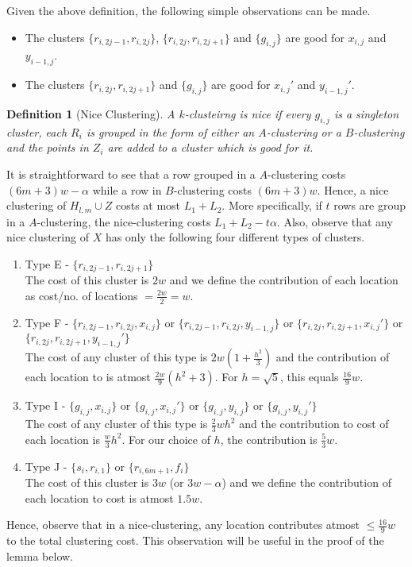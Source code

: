 \documentclass{article}
\newtheorem{definition}[theorem]{Definition}
\begin{document}
Given the above definition, the following simple observations can be made. 
\begin{itemize}[nolistsep,noitemsep]
\item The clusters $\{r_{i,2j-1}, r_{i, 2j}\}$, $\{r_{i,2j}, r_{i, 2j+1}\}$ and $\{g_{i,j}\}$ are good for $x_{i,j}$ and $y_{i-1,j}$.
\item The clusters $\{r_{i,2j}, r_{i, 2j+1}\}$ and $\{g_{i,j}\}$ are good for $x_{i,j}'$ and $y_{i-1,j}'$.
\end{itemize}

\begin{definition}[Nice Clustering]
\label{defn:niceClustering}
A $k$-clusteirng is nice if every $g_{i,j}$ is a singleton cluster, each $R_i$ is grouped in the form of either an $A$-clustering or a $B$-clustering and the points in $Z_i$ are added to a cluster which is good for it.
\end{definition}

It is straightforward to see that a row grouped in a $A$-clustering costs $(6m+3)w-\alpha$ while a row in $B$-clustering costs $(6m+3)w$. Hence, a nice clustering of $H_{l,m} \cup Z$ costs at most $L_1 + L_2$. More specifically, if $t$ rows are group in a $A$-clustering, the nice-clustering costs $L_1+L_2-t\alpha$. Also, observe that any nice clustering of $X$ has only the following four different types of clusters. \begin{enumerate}[label=(\arabic*),nolistsep,leftmargin=*]
\item Type E - $\{r_{i,2j-1}, r_{i,2j+1}\}$ \\
The cost of this cluster is $2w$ and we define the contribution of each location as  cost/no. of locations $ = \frac{2w}{2} = w$.
\item Type F - $\{r_{i,2j-1}, r_{i, 2j}, x_{i, j}\}$ or $\{r_{i,2j-1}, r_{i, 2j}, y_{i-1, j}\}$ or $\{r_{i,2j}, r_{i, 2j+1}, x_{i, j}'\}$ or $\{r_{i,2j}, r_{i, 2j+1}, y_{i-1, j}'\}$\\
The cost of any cluster of this type is $2w(1+\frac{h^2}{3})$ and the contribution of each location to is atmost $\frac{2w}{9}(h^2+3)$. For $h = \sqrt 5$, this equals $\frac{16}{9}w$.  
\item Type I - $\{g_{i, j}, x_{i,j}\}$ or $\{g_{i, j}, x_{i,j}'\}$  or $\{g_{i, j}, y_{i,j}\}$  or $\{g_{i, j}, y_{i,j}'\}$\\
The cost of any cluster of this type is $\frac{2}{3}wh^2$ and the contribution to cost of each location is $\frac{w}{3}h^2$. For our choice of $h$, the contribution is $\frac{5}{3}w$.
\item Type J - $\{s_i, r_{i,1}\}$ or $\{r_{i,6m+1}, f_i\}$\\
The cost of this cluster is $3w$ (or $3w-\alpha$) and we define the contribution of each location to cost is atmost $1.5w$. 
\end{enumerate}
Hence, observe that in a nice-clustering, any location contributes atmost $\le \frac{16}{9}w$ to the total clustering cost. This observation will be useful in the proof of the lemma below.
\end{document}
